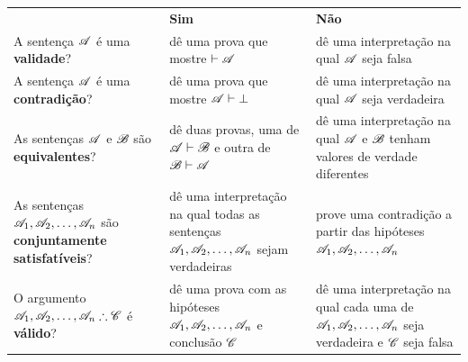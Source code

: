 \ifHTMLtarget
\begin{table}
\else
\begin{table}\small
\fi
	\begin{center}
\begin{tabular*}{\textwidth}{p{.25\textheight}p{.325\textheight}p{.325\textheight}}
 & \textbf{Sim}  & \textbf{Não}\\[12pt]
A sentença $\mathscr{A}$ é uma \textbf{validade}?
& dê uma prova que mostre $\vdash\mathscr{A}$
& dê uma interpretação na qual $\mathscr{A}$ seja falsa\\[12pt]
A sentença $\mathscr{A}$ é uma \textbf{contradição}?
& dê uma prova que mostre $\mathscr{A} \vdash \bot$
& dê uma interpretação na qual $\mathscr{A}$ seja verdadeira\\[12pt]
As sentenças $\mathscr{A}$ e $\mathscr{B}$ são \textbf{equivalentes}?
& dê duas provas, uma de $\mathscr{A}\vdash\mathscr{B}$ e outra de $\mathscr{B}\vdash\mathscr{A}$
& dê uma interpretação na qual $\mathscr{A}$ e $\mathscr{B}$ tenham valores de verdade diferentes\\[12pt]
As sentenças $\mathscr{A}_1, \mathscr{A}_2, \ldots, \mathscr{A}_n$ são \textbf{conjuntamente satisfatíveis}?
& dê uma interpretação na qual todas as sentenças $\mathscr{A}_1, \mathscr{A}_2, \ldots, \mathscr{A}_n$ sejam verdadeiras
& prove uma contradição a partir das hipóteses $\mathscr{A}_1, \mathscr{A}_2, \ldots, \mathscr{A}_n$\\[12pt]
O argumento $\metav{A}_1, \metav{A}_2, \ldots, \metav{A}_n \therefore \metav{C}$ é \textbf{válido}?
& dê uma prova com as hipóteses $\mathscr{A}_1, \mathscr{A}_2, \ldots, \mathscr{A}_n$ e conclusão $\mathscr{C}$
& dê uma interpretação na qual cada uma de $\mathscr{A}_1, \mathscr{A}_2, \ldots, \mathscr{A}_n$ seja verdadeira e $\mathscr{C}$ seja falsa\\
\end{tabular*}
\end{center}
\ifHTMLtarget
\end{table}
\else
\end{table}
\fi

